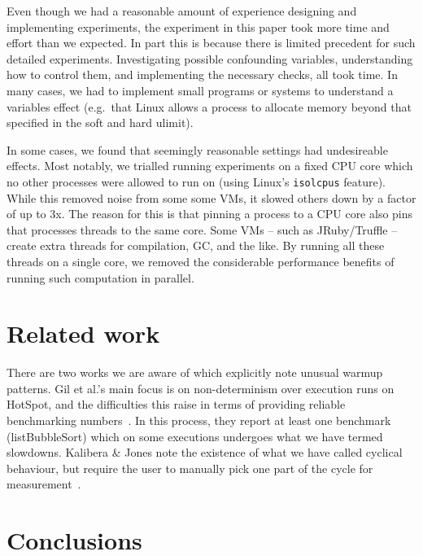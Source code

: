 \documentclass[a4paper,UKenglish]{lipics}
\newcommand{\kalibera}{Kalibera \& Jones\xspace}
\begin{document}
Even though we had a reasonable amount of experience designing and implementing
experiments, the experiment in this paper took more time and effort than we
expected. In part this is because there is limited precedent for such detailed
experiments. Investigating possible confounding variables, understanding how to
control them, and implementing the necessary checks, all took time. In many
cases, we had to implement small programs or systems to understand a variables
effect (e.g.~that Linux allows a process to allocate memory beyond that
specified in the soft and hard ulimit).

In some cases, we found that seemingly reasonable settings had undesireable
effects. Most notably, we trialled running experiments on a fixed CPU core which
no other processes were allowed to run on (using Linux's \texttt{isolcpus}
feature). While this removed noise from some some VMs,
it slowed others down by
a factor of up to 3x. The reason for this is that pinning a process to a CPU
core also pins that processes threads to the same core. Some VMs -- such as
JRuby/Truffle -- create extra threads for compilation, GC, and the like. By
running all these threads on a single core, we removed the considerable
performance benefits of running such computation in parallel.


\section{Related work}

There are two works we are aware of which explicitly note unusual warmup
patterns. Gil et al.'s main focus is on non-determinism over execution runs on
HotSpot, and the difficulties this raise in terms of providing reliable
benchmarking numbers~\cite{gil11microbenchmark}. In this process, they report at
least one benchmark (listBubbleSort) which on some executions undergoes what we
have termed slowdowns. \kalibera note the
existence of what we have called cyclical behaviour, but require the user to
manually pick one part of the cycle for measurement~\cite{kalibera13rigorous}.


\section{Conclusions}
\label{sec:conclusion}



\end{document}
